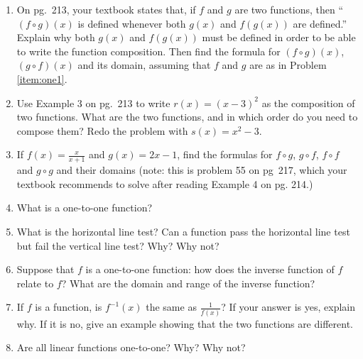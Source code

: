 \documentclass[12pt,dvipsnames]{article}
\newcommand*\circled[1]{\tikz[baseline=(char.base)]{%
		\node[shape=circle,fill=blue!20,draw,inner sep=2pt] (char) {#1};}}
\begin{document}
\begin{enumerate}[label=\arabic*., leftmargin=2\parindent,
labelindent=\parindent, labelsep=*]
\begin{enumerate}[labelindent=\parindent,leftmargin=*]
		
		

		
		
		
	

	

\end{enumerate}

\item On pg.~213, your textbook states that, if $f$ and $g$ are two functions, then \enquote{$\left (f\circ g\right)(x)$ is defined whenever both $g(x)$ and $f(g(x))$ are defined.} Explain why both $g(x)$ and $f(g(x))$ must be defined in order to be able to write the function composition. Then find the formula for  $\left (f\circ g\right)(x)$, $\left (g\circ f\right)(x)$ and its domain, assuming that $f$ and $g$ are as in Problem \ref{item:one1}. 

\item Use Example 3 on pg.~213 to write $\displaystyle r(x)=(x-3)^2$ as the composition of two functions. What are the two functions, and in which order do you need to compose them? Redo the problem with $\displaystyle s(x)=x^2-3$.

\item If $\displaystyle f(x)=\frac{x}{x+1}$ and $\displaystyle g(x)=2x-1$, find the formulas for $f\circ g$, $g\circ f$, $f\circ f$ and $g\circ g$ and their domains (note: this is problem 55 on pg~217, which your textbook recommends to solve after reading Example 4 on pg. 214.)


\item What is a one-to-one function?

\item What is the horizontal line test? Can a function pass the horizontal line test but fail the vertical line test? Why? Why not? 

\item Suppose that $f$ is a one-to-one function: how does the inverse function of $f$ relate to $f$? What are the domain and range of the inverse function?

\item If $f$ is a function, is $\displaystyle f^{-1}(x)$ the same as $\displaystyle \frac{1}{f(x)}$? If your answer is yes, explain why. If it is no, give an example showing that the two functions are different.

\item Are all linear functions one-to-one? Why? Why not?


\end{enumerate}
\end{document}
